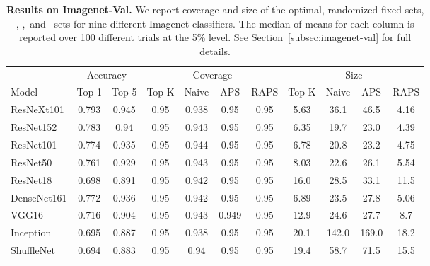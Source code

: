 \begin{table}[t] 
\centering 
\small 
\begin{tabular}{lcccccccccc} 
\toprule 
 & \multicolumn{2}{c}{Accuracy}  & \multicolumn{4}{c}{Coverage} & \multicolumn{4}{c}{Size} \\ 
\cmidrule(r){2-3}  \cmidrule(r){4-7}  \cmidrule(r){8-11} 
Model & Top-1 & Top-5 & Top K & Naive & APS & RAPS & Top K & Naive & APS & RAPS \\ 
\midrule 
 ResNeXt101 &  0.793 &  0.945 & 0.95 & 0.938 & 0.95 & 0.95 & 5.63 & 36.1 & 46.5 & 4.16 \\ 
 ResNet152 &  0.783 &  0.94 & 0.95 & 0.943 & 0.95 & 0.95 & 6.35 & 19.7 & 23.0 & 4.39 \\ 
 ResNet101 &  0.774 &  0.935 & 0.95 & 0.944 & 0.95 & 0.95 & 6.78 & 20.8 & 23.2 & 4.75 \\ 
 ResNet50 &  0.761 &  0.929 & 0.95 & 0.943 & 0.95 & 0.95 & 8.03 & 22.6 & 26.1 & 5.54 \\ 
 ResNet18 &  0.698 &  0.891 & 0.95 & 0.942 & 0.95 & 0.95 & 16.0 & 28.5 & 33.1 & 11.5 \\ 
 DenseNet161 &  0.772 &  0.936 & 0.95 & 0.942 & 0.95 & 0.95 & 6.89 & 23.5 & 27.8 & 5.06 \\ 
 VGG16 &  0.716 &  0.904 & 0.95 & 0.943 & 0.949 & 0.95 & 12.9 & 24.6 & 27.7 & 8.7 \\ 
 Inception &  0.695 &  0.887 & 0.95 & 0.938 & 0.95 & 0.95 & 20.1 & 142.0 & 169.0 & 18.2 \\ 
 ShuffleNet &  0.694 &  0.883 & 0.95 & 0.94 & 0.95 & 0.95 & 19.4 & 58.7 & 71.5 & 15.5 \\ 
\bottomrule 
\end{tabular} 
\caption{\textbf{Results on Imagenet-Val.} We report coverage and size of the optimal, randomized fixed sets, \naive, \aps,\ and \raps\ sets for nine different Imagenet classifiers. The median-of-means for each column is reported over 100 different trials at the 5\% level. See Section~\ref{subsec:imagenet-val} for full details.} 
\label{table:imagenet-val-005} 
\end{table} 
